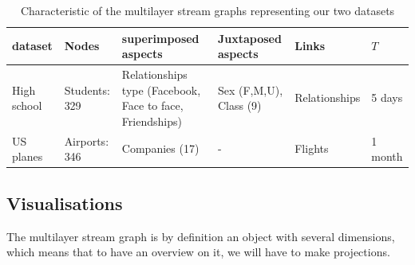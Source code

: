 \documentclass{svproc}
\begin{document}
\begin{table}
\begin{tabularx}{\linewidth}{|l|l|X|X|l|l|}
\hline
dataset & Nodes & superimposed aspects  & Juxtaposed aspects & Links & $T$ \\
\hline
High school & Students: 329&  Relationships type (Facebook, Face to face, Friendships) & Sex (F,M,U), Class (9)&  Relationships & 5 days \\
\hline
US planes & Airports: 346 & Companies (17) & - & Flights & 1 month \\
\hline
\end{tabularx}
\caption{Characteristic of the multilayer stream graphs representing our two datasets}
\label{tab:characteristics}
\end{table}


\subsection{Visualisations}
The multilayer stream graph is by definition an object with several dimensions, which means that to have an overview on it, we will have to make projections.
\end{document}
